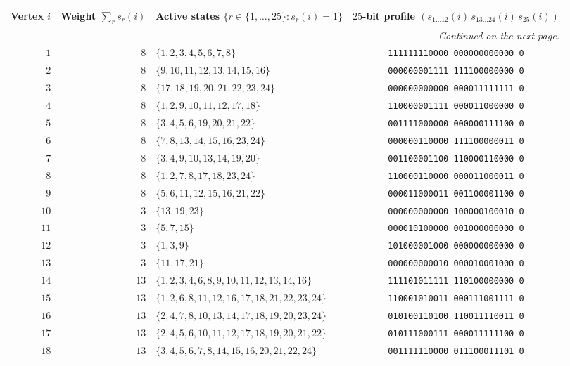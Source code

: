 \documentclass[aps,pra,reprint,superscriptaddress,longbibliography,nofootinbib,floatfix,10pt]{revtex4-2}
\theoremstyle{definition}
\begin{document}
\begin{longtable}{rrlc}
Vertex $i$ & Weight $\sum_r s_r(i)$ & Active states $\{r\in\{1,\ldots,25\} : s_r(i)=1\}$ & $25$-bit profile $(s_{1\ldots 12}(i)\,s_{13\ldots 24}(i)\,s_{25}(i))$ \\\midrule
\endhead
\midrule
\multicolumn{4}{r}{\emph{Continued on the next page.}}\\
\endfoot
\bottomrule\endlastfoot
$1$ & $8$ & $\{1,2,3,4,5,6,7,8\}$ & \texttt{111111110000\,000000000000\,0} \\
$2$ & $8$ & $\{9,10,11,12,13,14,15,16\}$ & \texttt{000000001111\,111100000000\,0} \\
$3$ & $8$ & $\{17,18,19,20,21,22,23,24\}$ & \texttt{000000000000\,000011111111\,0} \\
$4$ & $8$ & $\{1,2,9,10,11,12,17,18\}$ & \texttt{110000001111\,000011000000\,0} \\
$5$ & $8$ & $\{3,4,5,6,19,20,21,22\}$ & \texttt{001111000000\,000000111100\,0} \\
$6$ & $8$ & $\{7,8,13,14,15,16,23,24\}$ & \texttt{000000110000\,111100000011\,0} \\
$7$ & $8$ & $\{3,4,9,10,13,14,19,20\}$ & \texttt{001100001100\,110000110000\,0} \\
$8$ & $8$ & $\{1,2,7,8,17,18,23,24\}$ & \texttt{110000110000\,000011000011\,0} \\
$9$ & $8$ & $\{5,6,11,12,15,16,21,22\}$ & \texttt{000011000011\,001100001100\,0} \\ \hline
$10$ & $3$ & $\{13,19,23\}$ & \texttt{000000000000\,100000100010\,0} \\
$11$ & $3$ & $\{5,7,15\}$ & \texttt{000010100000\,001000000000\,0} \\
$12$ & $3$ & $\{1,3,9\}$ & \texttt{101000001000\,000000000000\,0} \\
$13$ & $3$ & $\{11,17,21\}$ & \texttt{000000000010\,000010001000\,0} \\ \hline
$14$ & $13$ & $\{1,2,3,4,6,8,9,10,11,12,13,14,16\}$ & \texttt{111101011111\,110100000000\,0} \\
$15$ & $13$ & $\{1,2,6,8,11,12,16,17,18,21,22,23,24\}$ & \texttt{110001010011\,000111001111\,0} \\
$16$ & $13$ & $\{2,4,7,8,10,13,14,17,18,19,20,23,24\}$ & \texttt{010100110100\,110011110011\,0} \\
$17$ & $13$ & $\{2,4,5,6,10,11,12,17,18,19,20,21,22\}$ & \texttt{010111000111\,000011111100\,0} \\*
$18$ & $13$ & $\{3,4,5,6,7,8,14,15,16,20,21,22,24\}$ & \texttt{001111110000\,011100011101\,0} \\*

\end{longtable}
\end{document}
